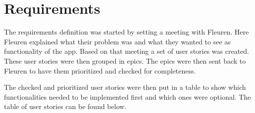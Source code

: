 \section{Requirements\label{sec:Requirements}}
The requirements definition was started by setting a meeting with Fleuren. Here Fleuren explained what their problem was and what they wanted to see as functionality of the app. Based on that meeting a set of user stories was created. These user stories were then grouped in epics. The epics were then sent back to Fleuren to have them prioritized and checked for completeness.

The checked and prioritized user stories were then put in a table to show which functionalities needed to be implemented first and which ones were optional. The table of user stories can be found below.

